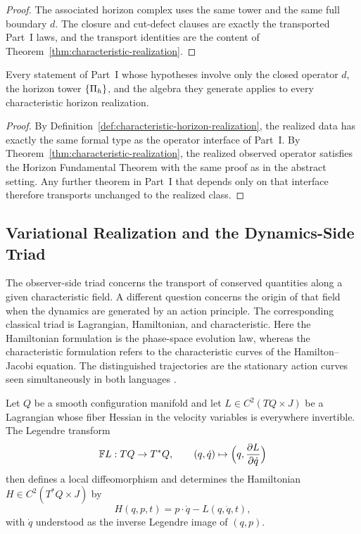 \begin{proof}
The associated horizon complex uses the same tower and the same full boundary
\(d\). The closure and cut-defect clauses are exactly the transported Part~I
laws, and the transport identities are the content of
Theorem~\ref{thm:characteristic-realization}.
\end{proof}

\begin{corollary}
\label{cor:transfer-part-one}
Every statement of Part~I whose hypotheses involve only the closed operator
$d$, the horizon tower $\{\Pi_{h}\}$, and the algebra they generate applies to
every characteristic horizon realization.
\end{corollary}

\begin{proof}
By Definition~\ref{def:characteristic-horizon-realization}, the realized data
has exactly the same formal type as the operator interface of Part~I. By
Theorem~\ref{thm:characteristic-realization}, the realized observed operator
satisfies the Horizon Fundamental Theorem with the same proof as in the abstract
setting. Any further theorem in Part~I that depends only on that interface
therefore transports unchanged to the realized class.
\end{proof}

\subsection{Variational Realization and the Dynamics-Side Triad}

The observer-side triad concerns the transport of conserved quantities along a
given characteristic field. A different question concerns the origin of that
field when the dynamics are generated by an action principle. The corresponding
classical triad is Lagrangian, Hamiltonian, and characteristic. Here the
Hamiltonian formulation is the phase-space evolution law, whereas the
characteristic formulation refers to the characteristic curves of the
Hamilton--Jacobi equation. The distinguished trajectories are the stationary
action curves seen simultaneously in both languages
\cite{Arnold1989}.

\begin{definition}
\label{def:regular-variational-system}
Let $Q$ be a smooth configuration manifold and let
$L \in C^2(TQ \times J)$ be a Lagrangian whose fiber Hessian in the velocity
variables is everywhere invertible. The Legendre transform
\[
\mathbb F L : TQ \to T^*Q,
\qquad
(q,\dot q) \mapsto \Bigl(q,\frac{\partial L}{\partial \dot q}\Bigr)
\]
then defines a local diffeomorphism and determines the Hamiltonian
$H \in C^2(T^*Q \times J)$ by
\[
H(q,p,t) = p\cdot \dot q - L(q,\dot q,t),
\]
with $\dot q$ understood as the inverse Legendre image of $(q,p)$.
\end{definition}

